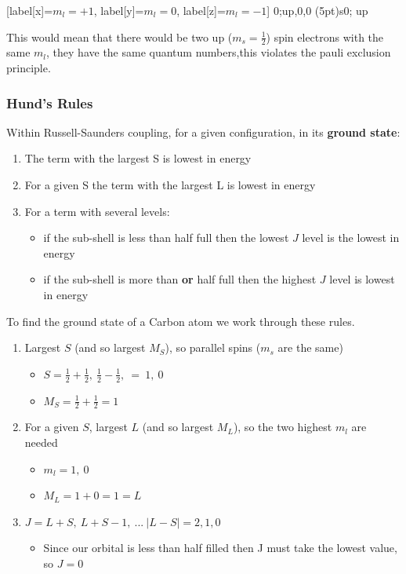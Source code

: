 \documentclass{article}
\begin{document}
    \begin{center}
        \begin{modiagram}[AO-width=20pt]
             [label[x]={$m_l=+1$}, label[y]={$m_l=0$}, label[z]={$m_l=-1$}] {0;up,0,0}
            \AO(5pt){s}{0; up}
        \end{modiagram}
    \end{center}

    This would mean that there would be two up ($m_s = \frac{1}{2}$) spin electrons with the same $m_l$, 
    they have the same quantum numbers,this violates the pauli exclusion principle.

    \subsubsection{Hund's Rules}
    Within Russell-Saunders coupling, for a given configuration, in its \textbf{ground state}:
    \begin{enumerate}
        \item The term with the largest S is lowest in energy
        \item For a given S the term with the largest L is lowest in energy
        \item For a term with several levels:
        \begin{itemize}
            \item if the sub-shell is less than half full  then the lowest $J$ level is the lowest in energy
            \item if the sub-shell is more than \textbf{or} half full then the highest $J$ level is lowest in energy
        \end{itemize}
    \end{enumerate}

    To find the ground state of a Carbon atom we work through these rules. 
    \begin{enumerate}
        \item Largest $S$ (and so largest $M_S$), so parallel spins ($m_s$ are the same)
        \begin{itemize}
            \item $S = \frac{1}{2} + \frac{1}{2},\ \frac{1}{2}-\frac{1}{2},\ =\ 1,\ 0$
            \item $M_S = \frac{1}{2} + \frac{1}{2} = 1$
        \end{itemize}
        \item For a given $S$, largest $L$ (and so largest $M_L$), so the two highest $m_l$ are needed
        \begin{itemize}
            \item $m_l = 1,\ 0$
            \item $M_L = 1 + 0 = 1 = L$
        \end{itemize}
        \item $J = L+S,\ L+S-1,\ ...\ |L-S| = 2, 1, 0$
        \begin{itemize}
            \item Since our orbital is less than half filled then J must take the lowest value, so $J=0$
        \end{itemize}
    \end{enumerate}
\end{document}
